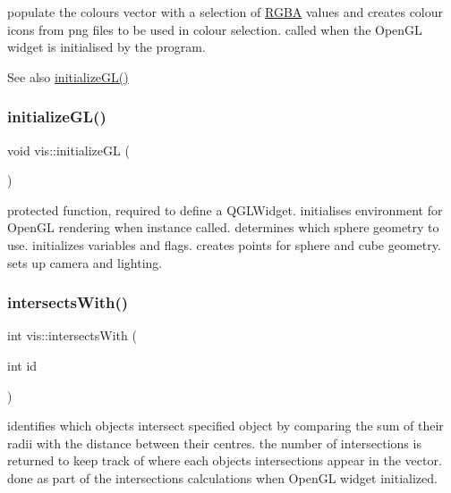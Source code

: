 populate the colours vector with a selection of \mbox{\hyperlink{struct_r_g_b_a}{R\+G\+BA}} values and creates colour icons from png files to be used in colour selection. called when the Open\+GL widget is initialised by the program.

\begin{DoxySeeAlso}{See also}
\mbox{\hyperlink{classvis_aacc3b133f9fae3b66e1e13bfe789f314}{initialize\+G\+L()}} 
\end{DoxySeeAlso}
\mbox{\label{classvis_aacc3b133f9fae3b66e1e13bfe789f314}} 
\subsubsection{\texorpdfstring{initialize\+G\+L()}{initializeGL()}}
{\footnotesize\ttfamily void vis\+::initialize\+GL (\begin{DoxyParamCaption}{ }\end{DoxyParamCaption})\hspace{0.3cm}{\ttfamily [protected]}}

protected function, required to define a Q\+G\+L\+Widget. initialises environment for Open\+GL rendering when instance called. determines which sphere geometry to use. initializes variables and flags. creates points for sphere and cube geometry. sets up camera and lighting. \mbox{\label{classvis_a0c4056a3b0c2526049078a8b454864f2}} 
\subsubsection{\texorpdfstring{intersects\+With()}{intersectsWith()}}
{\footnotesize\ttfamily int vis\+::intersects\+With (\begin{DoxyParamCaption}\item[{int}]{id }\end{DoxyParamCaption})}

identifies which objects intersect specified object by comparing the sum of their radii with the distance between their centres. the number of intersections is returned to keep track of where each objects intersections appear in the vector. done as part of the intersections calculations when Open\+GL widget initialized.

